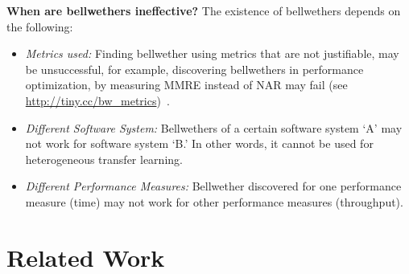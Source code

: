 \documentclass[10pt,journal,compsoc]{IEEEtran}
\newcommand{\bi}{\begin{itemize}}
\newcommand{\ei}{\end{itemize}}
\begin{document}
\noindent\textbf{When are bellwethers ineffective?}
The existence of bellwethers depends on the following: 
\bi
\item
\textit{Metrics used:} Finding bellwether using metrics that are not justifiable, may be unsuccessful, for example, discovering bellwethers in performance optimization, by measuring MMRE instead of NAR may fail (see \url{http://tiny.cc/bw_metrics})~\cite{nair2017using}.
\item
\textit{Different Software System:} Bellwethers of a certain software system `A' may not work for software system `B.' In other words, it cannot be used for heterogeneous transfer learning.
\item
 \textit{Different Performance Measures: } Bellwether discovered for one performance measure (time) may not work for other performance measures (throughput).
\ei



\section{Related Work}
\label{sect:related}

\end{document}
